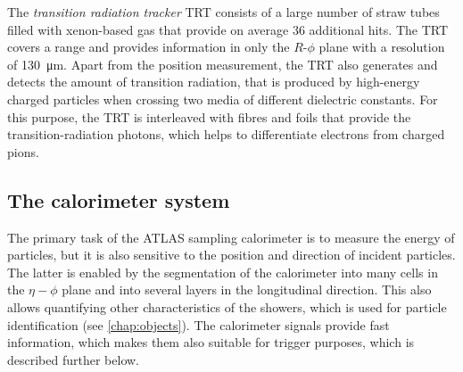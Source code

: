 The \emph{transition radiation tracker} TRT consists of a large number of straw tubes filled with xenon-based gas that provide on average 36 additional hits. The TRT covers a range  and provides information in only the $R$-$\phi$ plane with a resolution of \SI{130}{\micro\meter}.
Apart from the position measurement, the TRT also generates and detects the amount of transition radiation, that is produced by high-energy charged particles when crossing two media of different dielectric constants. For this purpose, the TRT is interleaved with fibres and foils that provide the transition-radiation photons, which helps to differentiate electrons from charged pions.




\subsection{The calorimeter system}
\label{subsec:calorimeter}
The primary task of the ATLAS sampling calorimeter is to measure the energy of particles, but it is also sensitive to the position and direction of incident particles. The latter is enabled by the segmentation of the calorimeter into many cells in the $\eta-\phi$ plane and into several layers in the longitudinal direction.
This also allows quantifying other characteristics of the showers, which is used for particle identification (see \cref{chap:objects}).
The calorimeter signals provide fast information, which makes them also suitable for trigger purposes, which is described further below.

